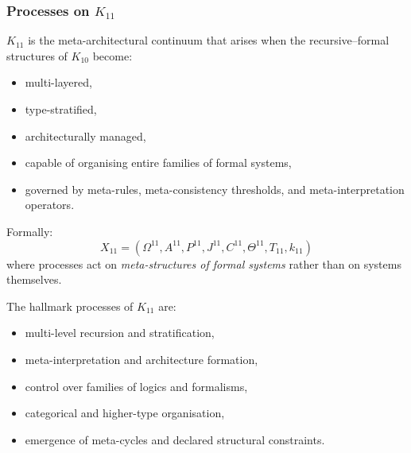

\subsubsection{Processes on $K_{11}$}
\label{sec:processes-k11}

$K_{11}$ is the meta-architectural continuum that arises when the
recursive–formal structures of $K_{10}$ become:
\begin{itemize}
    \item multi-layered,
    \item type-stratified,
    \item architecturally managed,
    \item capable of organising entire families of formal systems,
    \item governed by meta-rules, meta-consistency thresholds, 
          and meta-interpretation operators.
\end{itemize}

Formally:
\[
X_{11} = (\Omega^{11}, A^{11}, P^{11}, J^{11}, 
          C^{11}, \Theta^{11}, T_{11}, k_{11})
\]
where processes act on \emph{meta-structures of formal systems} rather 
than on systems themselves.

The hallmark processes of $K_{11}$ are:
\begin{itemize}
    \item multi-level recursion and stratification,
    \item meta-interpretation and architecture formation,
    \item control over families of logics and formalisms,
    \item categorical and higher-type organisation,
    \item emergence of meta-cycles and declared structural constraints.
\end{itemize}

